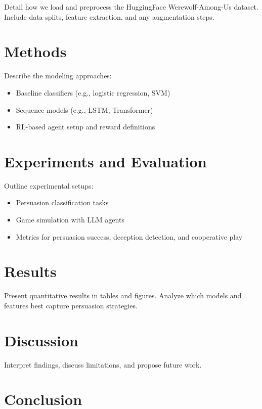 \documentclass[
  letterpaper,
  DIV=11,
  numbers=noendperiod]{scrreprt}
\providecommand{\tightlist}{%
  \setlength{\itemsep}{0pt}\setlength{\parskip}{0pt}}\usepackage{longtable,booktabs,array}
\begin{document}
Detail how we load and preprocess the HuggingFace Werewolf-Among-Us
dataset. Include data splits, feature extraction, and any augmentation
steps.

\chapter{Methods}\label{methods}

Describe the modeling approaches:

\begin{itemize}
\tightlist
\item
  Baseline classifiers (e.g., logistic regression, SVM)
\item
  Sequence models (e.g., LSTM, Transformer)
\item
  RL-based agent setup and reward definitions
\end{itemize}

\chapter{Experiments and Evaluation}\label{experiments-and-evaluation}

Outline experimental setups:

\begin{itemize}
\tightlist
\item
  Persuasion classification tasks
\item
  Game simulation with LLM agents
\item
  Metrics for persuasion success, deception detection, and cooperative
  play
\end{itemize}

\chapter{Results}\label{results}

Present quantitative results in tables and figures. Analyze which models
and features best capture persuasion strategies.

\chapter{Discussion}\label{discussion}

Interpret findings, discuss limitations, and propose future work.

\chapter{Conclusion}\label{conclusion}
\end{document}
